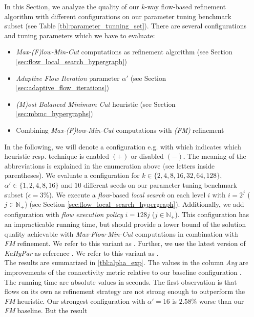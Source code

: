In this Section, we analyze the quality of our $k$-way flow-based refinement algorithm with
different configurations on our parameter tuning benchmark subset (see Table \ref{tbl:parameter_tunning_set}).
There are several configurations and tuning parameters which we have to evaluate:
\begin{itemize}
\item \emph{Max-(F)low-Min-Cut} computations as refinement algorithm (see Section \ref{sec:flow_local_search_hypergraph})
\item \emph{Adaptive Flow Iteration} parameter $\alpha'$ (see Section \ref{sec:adaptive_flow_iterations})
\item \emph{(M)ost Balanced Minimum Cut} heuristic (see Section \ref{sec:mbmc_hypergraphs})
\item Combining \emph{Max-(F)low-Min-Cut} computations with \emph{(FM)} refinement
\end{itemize}
In the following, we will denote a configuration e.g. with \FlowVariant{+}{-}{-} which indicates
which heuristic resp. technique is enabled $(+)$ or disabled $(-)$. The meaning of the 
abbreviations is explained in the enumeration above (see letters inside parentheses). We evaluate
a configuration for $k \in \{2,4,8,16,32,64,128\}$, $\alpha' \in \{1,2,4,8,16\}$
and $10$ different seeds on our parameter tuning benchmark subset ($\epsilon = 3\%$). 
We execute a \emph{flow}-based \emph{local search} 
on each level $i$ with $i = 2^j$ ($j \in \mathbb{N}_+$) 
(see Section \ref{sec:flow_local_search_hypergraph}). Additionally, we add configuration
\FlowVariant{+}{+}{+} with \emph{flow execution policy} $i = 128j$ ($j \in \mathbb{N}_+$). 
This configuration has an impracticable running time, but should provide a lower bound
of the solution quality achievable with \emph{Max-Flow-Min-Cut} computations in combination
with \emph{FM} refinement.
We refer to this variant as . Further, we use the 
latest version of \emph{KaHyPar} as reference \cite{heuer2017improving}. We refer to this variant as 
\FlowVariant{-}{-}{+}. \\
The results are summarized in \autoref{tbl:alpha_exp}. The values
in the column \emph{Avg} are improvements of the connectivity metric
relative to our baseline configuration \FlowVariant{-}{-}{+}. The running
time are absolute values in seconds. The first observation is that flows on
its own as refinement strategy are not strong enough to outperform the
\emph{FM} heuristic. Our strongest configuration with $\alpha' = 16$
is $2.58\%$ worse than our \emph{FM} baseline. But the result 
